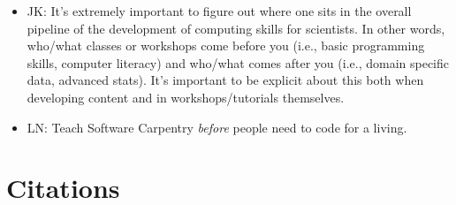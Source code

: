 \documentclass{article}
\begin{document}
\begin{itemize}
  \item JK: It's extremely important to figure out where one sits in the overall pipeline of the development of computing skills for scientists. In other words, who/what classes or workshops come before you (i.e., basic programming skills, computer literacy) and who/what comes after you (i.e., domain specific data, advanced stats). It's important to be explicit about this both when developing content and in workshops/tutorials themselves.

  \item LN: Teach Software Carpentry \emph{before} people need to code for a living.

\end{itemize}

\section{Citations}

\cite{hannay2009}
\cite{prabhu2011}
\cite{wilson1996}
\cite{wilson2006a}
\cite{wilson2006b}
\cite{wilson2009}



\end{document}
